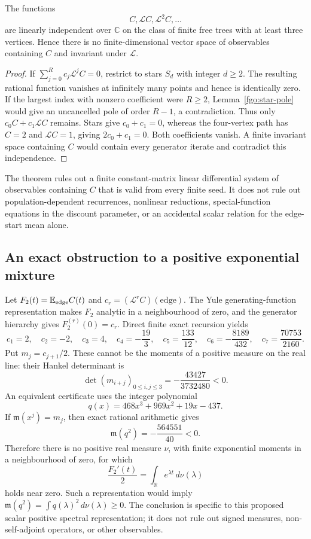 \begin{theorem}
\label{fgo:independence}
The functions
\[
 C,\mathcal LC,\mathcal L^2C,\ldots
\]
are linearly independent over $\mathbb C$ on the class of finite free
trees with at least three vertices. Hence there is no finite-dimensional
vector space of observables containing $C$ and invariant under
$\mathcal L$.
\end{theorem}
\begin{proof}
If $\sum_{j=0}^R c_j\mathcal L^jC=0$, restrict to stars $S_d$ with
integer $d\ge2$. The resulting rational function vanishes at infinitely
many points and hence is identically zero. If the largest index with
nonzero coefficient were $R\ge2$, Lemma~\ref{fgo:star-pole} would give
an uncancelled pole of order $R-1$, a contradiction. Thus only
$c_0C+c_1\mathcal LC$ remains. Stars give $c_0+c_1=0$, whereas the
four-vertex path has $C=2$ and $\mathcal LC=1$, giving $2c_0+c_1=0$.
Both coefficients vanish. A finite invariant space containing $C$
would contain every generator iterate and contradict this independence.
\end{proof}

The theorem rules out a finite constant-matrix linear differential system
of observables containing $C$ that is valid from every finite seed.
It does not rule out population-dependent recurrences, nonlinear
reductions, special-function equations in the discount parameter, or
an accidental scalar relation for the edge-start mean alone.

\subsection{An exact obstruction to a positive exponential mixture}

Let $F_2(t)=\mathbb E_{\rm edge}C(t)$ and
$c_r=(\mathcal L^rC)(\mathrm{edge})$. The Yule generating-function
representation makes $F_2$ analytic in a neighbourhood of zero, and
the generator hierarchy gives $F_2^{(r)}(0)=c_r$. Direct finite exact
recursion yields
\[
 c_1=2,\quad c_2=-2,\quad c_3=4,\quad c_4=-\frac{19}{3},
 \quad c_5=\frac{133}{12},\quad c_6=-\frac{8189}{432},
 \quad c_7=\frac{70753}{2160}.
\]
Put $m_j=c_{j+1}/2$. These cannot be the moments of a positive measure
on the real line: their Hankel determinant is
\[
 \det(m_{i+j})_{0\le i,j\le3}=-\frac{43427}{3732480}<0.
\]
An equivalent certificate uses the integer polynomial
\[
 q(x)=468x^3+969x^2+19x-437.
\]
If $\mathfrak m(x^j)=m_j$, then exact rational arithmetic gives
\[
 \mathfrak m(q^2)=-\frac{564551}{40}<0.
\]
Therefore there is no positive real measure $\nu$, with finite
exponential moments in a neighbourhood of zero, for which
\[
 \frac{F_2'(t)}2=\int_{\mathbb R}e^{\lambda t}\,d\nu(\lambda)
\]
holds near zero. Such a representation would imply
$\mathfrak m(q^2)=\int q(\lambda)^2\,d\nu(\lambda)\ge0$.
The conclusion is specific to this proposed scalar positive spectral
representation; it does not rule out signed measures, non-self-adjoint
operators, or other observables.

